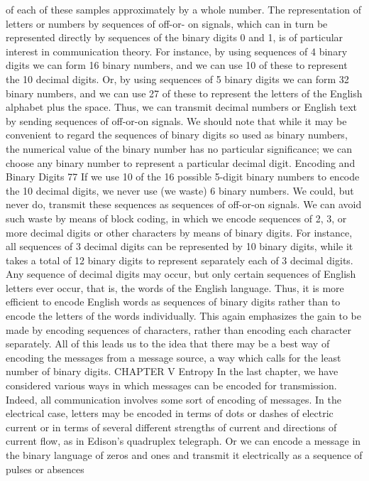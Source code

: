 of each of these samples approximately by a whole number.
The representation of letters or numbers by sequences of off-or-
on signals, which can in turn be represented directly by sequences
of the binary digits 0 and 1, is of particular interest in communication
theory. For instance, by using sequences of 4 binary digits
we can form 16 binary numbers, and we can use 10 of these to
represent the 10 decimal digits. Or, by using sequences of 5 binary
digits we can form 32 binary numbers, and we can use 27 of these
to represent the letters of the English alphabet plus the space. Thus,
we can transmit decimal numbers or English text by sending
sequences of off-or-on signals.
We should note that while it may be convenient to regard the
sequences of binary digits so used as binary numbers, the numerical
value of the binary number has no particular significance; we can
choose any binary number to represent a particular decimal digit.
Encoding and Binary Digits
77
If we use 10 of the 16 possible 5-digit binary numbers to encode
the 10 decimal digits, we never use (we waste) 6 binary numbers.
We could, but never do, transmit these sequences as sequences of
off-or-on signals. We can avoid such waste by means of block
coding, in which we encode sequences of 2, 3, or more decimal
digits or other characters by means of binary digits. For instance,
all sequences of 3 decimal digits can be represented by 10 binary
digits, while it takes a total of 12 binary digits to represent separately
each of 3 decimal digits.
Any sequence of decimal digits may occur, but only certain
sequences of English letters ever occur, that is, the words of the
English language. Thus, it is more efficient to encode English words
as sequences of binary digits rather than to encode the letters of
the words individually. This again emphasizes the gain to be made
by encoding sequences of characters, rather than encoding each
character separately.
All of this leads us to the idea that there may be a best way of
encoding the messages from a message source, a way which calls
for the least number of binary digits.
CHAPTER V Entropy
In the last chapter, we have considered various ways in which
messages can be encoded for transmission. Indeed, all communication
involves some sort of encoding of messages. In the electrical
case, letters may be encoded in terms of dots or dashes of electric
current or in terms of several different strengths of current and
directions of current flow, as in Edison’s quadruplex telegraph. Or
we can encode a message in the binary language of zeros and ones
and transmit it electrically as a sequence of pulses or absences
